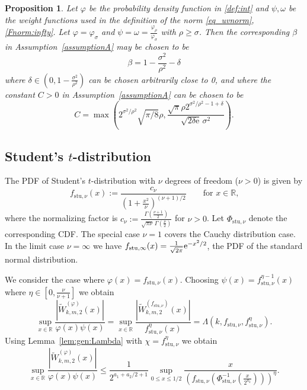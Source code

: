 \documentclass[namedate,webpdf,imanum]{ima-authoring-arxiv}%
\theoremstyle{thmstyletwo}%
\newtheorem{proposition}{Proposition}%
\numberwithin{equation}{section}
\newcommand{\stu}{\mathrm{stu}}
\newcommand{\RR}{\mathbb{R}}
\begin{document}
\begin{proposition}\label{pr:beta}
Let $\varphi$ be the probability density function in \eqref{def:int} and $\psi, \omega$ be the weight functions used in the definition of the norm \eqref{eq_uvnorm}, \eqref{Fnorm:infty}. Let $\varphi=\varphi_\sigma$ and $\psi=\omega=\frac{\varphi_\rho}{\varphi_\sigma}$ with $\rho \ge \sigma$. Then the corresponding $\beta$ in Assumption~\ref{assumptionA} may be chosen to be 
\begin{equation*}%
\beta=1-\frac{\sigma^2}{\rho^2}-\delta
\end{equation*}
where $\delta\in (0,1-\frac{\sigma^2}{\rho^2})$ can be chosen arbitrarily close to 0, and where the constant $C > 0$ in Assumption~\ref{assumptionA} can be chosen to be
\begin{equation*}
C = \max\left( 2^{\sigma^2/\rho^2} \sqrt{\pi/8} \rho, \frac{ \sqrt{\pi} \rho 2^{\sigma^2/\rho^2 - 1 + \delta} }{ \sqrt{2\delta \mathrm{e} } \, \sigma^2}  \right).
\end{equation*}
\end{proposition}

\subsection{Student's $t$-distribution} 

The PDF of Student's $t$-distribution with $\nu$ degrees of freedom ($\nu>0$) is given by $$f_{\stu,\nu}(x):=\frac{c_\nu}{\left(1+\frac{x^2}{\nu}\right)^{(\nu+1)/2}}\qquad \mbox{for $x\in \RR$,}$$ where the normalizing factor is $c_\nu:=\frac{\Gamma\left(\frac{\nu+1}{2}\right)}{\sqrt{\pi \nu} \, \Gamma\left(\frac{\nu}{2}\right)}$ for $\nu>0$. Let $\Phi_{\stu,\nu}$ denote the corresponding CDF. The special case $\nu=1$ covers the Cauchy distribution case. In the limit case $\nu=\infty$ we have $f_{\stu,\infty}(x)=\frac{1}{\sqrt{2 \pi}} {\rm e}^{-x^2/2}$, the PDF of the standard normal distribution.

We consider the case where $\varphi(x)=f_{\stu,\nu}(x)$. Choosing $\psi(x)=f_{\stu,\nu}^{\eta-1}(x)$ where $\eta \in [0,\tfrac{\nu}{\nu+1}]$ we obtain $$\sup_{x \in \mathbb{R}} \frac{|\widetilde{W}^{(\varphi)}_{k, m, 2}(x)|}{\varphi(x) \psi(x)}=\sup_{x \in \mathbb{R}} \frac{|\widetilde{W}^{(f_{\stu,\nu})}_{k, m, 2}(x)|}{f_{\stu,\nu}^{\eta}(x)}=\Lambda(k,f_{\stu,\nu},f_{\stu,\nu}^{\eta}).$$ Using Lemma~\ref{lem:gen:Lambda} with $\chi = f_{\stu,\nu}^\eta$ we obtain  
\begin{equation}\label{eq:stud1}
\sup_{x \in \mathbb{R}} \frac{|\widetilde{W}^{(\varphi)}_{k, m, 2}(x)|}{\varphi(x) \psi(x)} \le \frac{1}{2^{a_1+a_2/2 + 1}} \sup_{0 \le x \le 1/2} \frac{x}{\left(f_{\stu,\nu}\left(\Phi_{\stu,\nu}^{-1}\left( \frac{x}{2^{a_2}} \right)\right)\right)^{\eta}}.
\end{equation}
\end{document}
